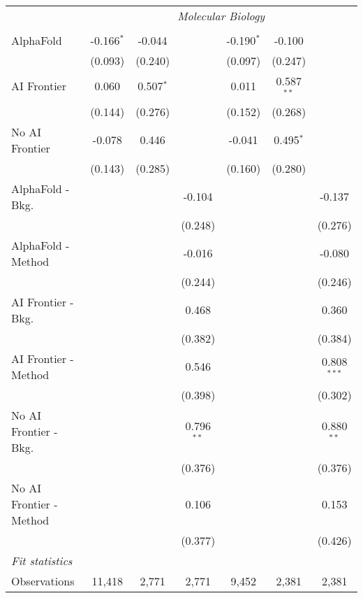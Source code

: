 \begin{tabular}{lcccccc}
 & \multicolumn{6}{c}{\textit{Molecular Biology}} \\ \\
   AlphaFold               & -0.166$^{*}$ & -0.044      &              & -0.190$^{*}$ & -0.100       &   \\   
                           & (0.093)      & (0.240)     &              & (0.097)      & (0.247)      &   \\   
   AI Frontier             & 0.060        & 0.507$^{*}$ &              & 0.011        & 0.587$^{**}$ &   \\   
                           & (0.144)      & (0.276)     &              & (0.152)      & (0.268)      &   \\   
   No AI Frontier          & -0.078       & 0.446       &              & -0.041       & 0.495$^{*}$  &   \\   
                           & (0.143)      & (0.285)     &              & (0.160)      & (0.280)      &   \\   
   AlphaFold - Bkg.        &              &             & -0.104       &              &              & -0.137\\   
                           &              &             & (0.248)      &              &              & (0.276)\\   
   AlphaFold - Method      &              &             & -0.016       &              &              & -0.080\\   
                           &              &             & (0.244)      &              &              & (0.246)\\   
   AI Frontier - Bkg.      &              &             & 0.468        &              &              & 0.360\\   
                           &              &             & (0.382)      &              &              & (0.384)\\   
   AI Frontier - Method    &              &             & 0.546        &              &              & 0.808$^{***}$\\   
                           &              &             & (0.398)      &              &              & (0.302)\\   
   No AI Frontier - Bkg.   &              &             & 0.796$^{**}$ &              &              & 0.880$^{**}$\\   
                           &              &             & (0.376)      &              &              & (0.376)\\   
   No AI Frontier - Method &              &             & 0.106        &              &              & 0.153\\   
                           &              &             & (0.377)      &              &              & (0.426)\\   
   \midrule
   \emph{Fit statistics}\\
   Observations            & 11,418       & 2,771       & 2,771        & 9,452        & 2,381        & 2,381\\  
   

\end{tabular}
